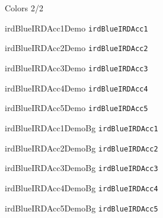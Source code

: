\documentclass[12pt,aspectratio=169]{beamer}
\begin{document}
\begin{frame}{Colors 2/2}									
  \begin{multicols}{2}

        \begin{beamercolorbox}[wd=\linewidth,ht=2ex,dp=0.7ex]{irdBlueIRDAcc1Demo}
            \texttt{irdBlueIRDAcc1}
        \end{beamercolorbox}
        \begin{beamercolorbox}[wd=\linewidth,ht=2ex,dp=0.7ex]{irdBlueIRDAcc2Demo}
            \texttt{irdBlueIRDAcc2}
        \end{beamercolorbox}
        \begin{beamercolorbox}[wd=\linewidth,ht=2ex,dp=0.7ex]{irdBlueIRDAcc3Demo}
            \texttt{irdBlueIRDAcc3}
        \end{beamercolorbox}
        \begin{beamercolorbox}[wd=\linewidth,ht=2ex,dp=0.7ex]{irdBlueIRDAcc4Demo}
            \texttt{irdBlueIRDAcc4}
        \end{beamercolorbox}
        \begin{beamercolorbox}[wd=\linewidth,ht=2ex,dp=0.7ex]{irdBlueIRDAcc5Demo}
            \texttt{irdBlueIRDAcc5}
        \end{beamercolorbox}

        \begin{beamercolorbox}[wd=\linewidth,ht=2ex,dp=0.7ex]{irdBlueIRDAcc1DemoBg}
            \texttt{irdBlueIRDAcc1}
        \end{beamercolorbox}
        \begin{beamercolorbox}[wd=\linewidth,ht=2ex,dp=0.7ex]{irdBlueIRDAcc2DemoBg}
            \texttt{irdBlueIRDAcc2}
        \end{beamercolorbox}
        \begin{beamercolorbox}[wd=\linewidth,ht=2ex,dp=0.7ex]{irdBlueIRDAcc3DemoBg}
            \texttt{irdBlueIRDAcc3}
        \end{beamercolorbox}
        \begin{beamercolorbox}[wd=\linewidth,ht=2ex,dp=0.7ex]{irdBlueIRDAcc4DemoBg}
            \texttt{irdBlueIRDAcc4}
        \end{beamercolorbox}
        \begin{beamercolorbox}[wd=\linewidth,ht=2ex,dp=0.7ex]{irdBlueIRDAcc5DemoBg}
            \texttt{irdBlueIRDAcc5}
        \end{beamercolorbox}
  \end{multicols}
\end{frame}
\end{document}
